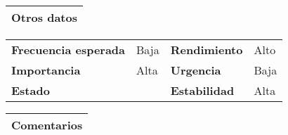 \documentclass[11pt,a4paper]{article}
\begin{document}
\begin{table}[H]
	\begin{tabularx}{\textwidth}{X}
		\textbf{Otros datos}\\ \hline
	\end{tabularx}
	\begin{tabularx}{\textwidth}{lXlX}
		\textbf{Frecuencia esperada} & Baja & \textbf{Rendimiento} & Alto\\
		\textbf{Importancia} & Alta & \textbf{Urgencia} & Baja\\
		\textbf{Estado} &  & \textbf{Estabilidad} & Alta \\
	\end{tabularx}
	
	\begin{tabularx}{\textwidth}{X}
		\textbf{Comentarios}\\ \hline
	\end{tabularx}
\end{table}

\newpage


\end{document}
